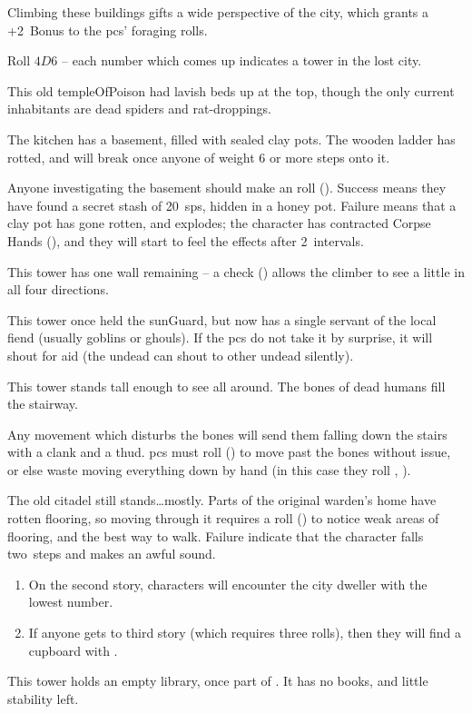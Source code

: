 \begin{multicols}{2}
Climbing these buildings gifts a wide perspective of the city, which grants a +2~Bonus to the \glspl{pc}' foraging rolls.

Roll $4D6$ -- each number which comes up indicates a tower in the lost city.

\begin{dlist}
  \item
  This old \gls{templeOfPoison} had lavish beds up at the top, though the only current inhabitants are dead spiders and rat-droppings.

  The kitchen has a basement, filled with sealed clay pots.
  The wooden ladder has rotted, and will break once anyone of \gls{weight} 6 or more steps onto it.

  Anyone investigating the basement should make an  roll (\tn[10]).
  Success means they have found a secret stash of 20~\glspl{sp}, hidden in a honey pot.
  Failure means that a clay pot has gone rotten, and explodes; the character has contracted Corpse Hands (), and they will start to feel the effects after 2~\glspl{interval}.
  \item
  This tower has one wall remaining -- a  check (\tn[8]) allows the climber to see a little in all four directions.
  \item
  This tower once held the \gls{sunGuard}, but now has a single servant of the local fiend (usually goblins or ghouls).
  If the \glspl{pc} do not take it by surprise, it will shout for aid (the undead can shout to other undead silently).
  \item
  This tower stands tall enough to see all around.
  The bones of dead humans fill the stairway.

  Any movement which disturbs the bones will send them falling down the stairs with a clank and a thud.
  \Glspl{pc} must roll  (\tn[11]) to move past the bones without issue, or else waste  moving everything down by hand (in this case they roll , \tn[7]).
  \item
  The old citadel still stands\ldots mostly.
  Parts of the original \gls{warden}'s home have rotten flooring, so moving through it requires a  roll (\tn[8]) to notice weak areas of flooring, and the best way to walk.
  Failure indicate that the character falls two~\glspl{step}%
  and makes an awful sound.
  \begin{enumerate}
    \item
    On the second story, characters will encounter the city dweller with the lowest number.
    \item
    If anyone gets to third story (which requires three rolls), then they will find a cupboard with \lootBig.
  \end{enumerate}
  \item
  This tower holds an empty library, once part of .
  It has no books, and little stability left.


\end{dlist}
\end{multicols}
